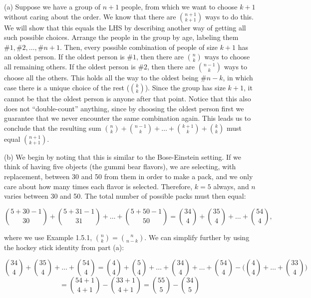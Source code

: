 \begin{solution}
    
    (a) Suppose we have a group of $n + 1$ people, from which we want to choose $k + 1$ without caring about the order.
    We know that there are $\binom{n + 1}{k + 1}$ ways to do this.
    We will show that this equals the LHS by describing another way of getting all such possible choices.
    Arrange the people in the group by age, labeling them $\#1, \#2, \ldots, \#n + 1$.
    Then, every possible combination of people of size $k + 1$ has an oldest person.
    If the oldest person is $\#1$, then there are $\binom{n}{k}$ ways to choose all remaining others.
    If the oldest person is $\#2$, then there are $\binom{n - 1}{k}$ ways to choose all the others.
    This holds all the way to the oldest being $\#n - k$, in which case there is a unique choice of the rest ($\binom{k}{k}$).
    Since the group has size $k + 1$, it cannot be that the oldest person is anyone after that point.
    Notice that this also does not ``double-count'' anything, since by choosing the oldest person first we guarantee that we never encounter the same combination again.
    This leads us to conclude that the resulting sum $\binom{n}{k} + \binom{n - 1}{k} + \ldots + \binom{k + 1}{k} + \binom{k}{k}$ must equal $\binom{n + 1}{k + 1}$.

    (b) We begin by noting that this is similar to the Bose-Einstein setting.
    If we think of having five objects (the gummi bear flavors), we are selecting, with replacement, between 30 and 50 from them in order to make a pack, and we only care about how many times each flavor is selected.
    Therefore, $k = 5$ always, and $n$ varies between 30 and 50.
    The total number of possible packs must then equal:

    \[\binom{5 + 30 - 1}{30} + \binom{5 + 31 - 1}{31} + \ldots + \binom{5 + 50 - 1}{50} = \binom{34}{4} + \binom{35}{4} + \ldots + \binom{54}{4},\]

    where we use Example 1.5.1, $\binom{n}{k} = \binom{n}{n - k}$.
    We can simplify further by using the hockey stick identity from part (a):

    \[\binom{34}{4} + \binom{35}{4} + \ldots + \binom{54}{4} = \binom{4}{4} + \binom{5}{4} + \ldots + \binom{34}{4} + \ldots + \binom{54}{4} - \Biggl(\binom{4}{4} + \ldots + \binom{33}{4}\Biggr)\]
    \[= \binom{54 + 1}{4 + 1} - \binom{33 + 1}{4 + 1} = \binom{55}{5} - \binom{34}{5}\]

\end{solution}

